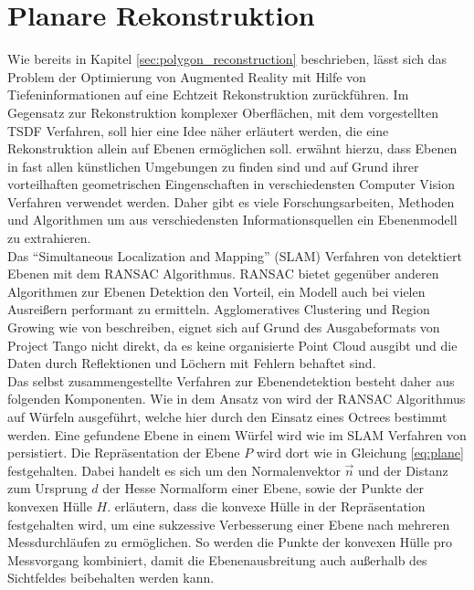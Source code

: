\section{Planare Rekonstruktion} \label{sec:plane-reconstruction}

Wie bereits in Kapitel \ref{sec:polygon_reconstruction} beschrieben, lässt sich das Problem der Optimierung von Augmented Reality mit Hilfe von Tiefeninformationen auf eine Echtzeit Rekonstruktion zurückführen. Im Gegensatz zur Rekonstruktion komplexer Oberflächen, mit dem vorgestellten TSDF Verfahren, soll hier eine Idee näher erläutert werden, die eine Rekonstruktion allein auf Ebenen ermöglichen soll. \citet{yang2010plane} erwähnt hierzu, dass Ebenen in fast allen künstlichen Umgebungen zu finden sind und auf Grund ihrer vorteilhaften geometrischen Eingenschaften in verschiedensten Computer Vision Verfahren verwendet werden. Daher gibt es viele Forschungsarbeiten, Methoden und Algorithmen um aus verschiedensten Informationsquellen ein Ebenenmodell zu extrahieren.\\

Das \enquote{Simultaneous Localization and Mapping} (SLAM) Verfahren von \citet{trevor2012planar} detektiert Ebenen mit dem RANSAC Algorithmus. RANSAC bietet gegenüber anderen Algorithmen zur Ebenen Detektion den Vorteil, ein Modell auch bei vielen Ausreißern performant zu ermitteln. Agglomeratives Clustering und Region Growing wie von \citet{feng2014fast} beschreiben, eignet sich auf Grund des Ausgabeformats von Project Tango nicht direkt, da es keine organisierte Point Cloud ausgibt und die Daten durch Reflektionen und Löchern mit Fehlern behaftet sind. \\

Das selbst zusammengestellte Verfahren zur Ebenendetektion besteht daher aus folgenden Komponenten. Wie in dem Ansatz von \citet{yang2010plane} wird der RANSAC Algorithmus auf Würfeln ausgeführt, welche hier durch den Einsatz eines Octrees bestimmt werden. Eine gefundene Ebene in einem Würfel wird wie im SLAM Verfahren von \citet{trevor2012planar} persistiert. Die Repräsentation der Ebene \(P\) wird dort wie in Gleichung \ref{eq:plane} festgehalten. Dabei handelt es sich um den Normalenvektor \(\vec{n}\) und der Distanz zum Ursprung \(d\) der Hesse Normalform einer Ebene, sowie der Punkte der konvexen Hülle \(H\). \citet{trevor2012planar} erläutern, dass die konvexe Hülle in der Repräsentation festgehalten wird, um eine sukzessive Verbesserung einer Ebene nach mehreren Messdurchläufen zu ermöglichen. So werden die Punkte der konvexen Hülle pro Messvorgang kombiniert, damit die Ebenenausbreitung auch außerhalb des Sichtfeldes beibehalten werden kann. \\

